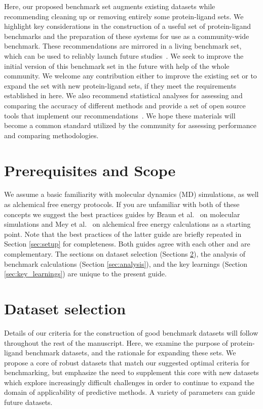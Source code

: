 \documentclass[9pt,bestpractices,pubversion]{livecoms}
\begin{document}
Here, our proposed benchmark set augments existing datasets while recommending cleaning up or removing entirely some protein-ligand sets. We highlight key considerations in the construction of a useful set of protein-ligand benchmarks and the preparation of these systems for use as a community-wide benchmark. These recommendations are mirrored in a living benchmark set, which can be used to reliably launch future studies~\cite{dfhahn_openforcefield_2021}. We seek to improve the initial version of this benchmark set in the future with help of the whole community. We welcome any contribution either to improve the existing set or to expand the set with new protein-ligand sets, if they meet the requirements established in here. 
%
We also recommend statistical analyses for assessing and comparing the accuracy of different methods and provide a set of open source tools that implement our recommendations~\cite{github_openforcefield_arsenic_2020}. 
%
We hope these materials will become a common standard utilized by the community for assessing performance and comparing methodologies.  


\section{Prerequisites and Scope}
We assume a basic familiarity with molecular dynamics (MD) simulations, as well as alchemical free energy protocols. 
If you are unfamiliar with both of these concepts we suggest the best practices guides by Braun et al.~\cite{braunBestPracticesFoundations2019} on molecular simulations and Mey et al.~\cite{meyBestPracticesAlchemical2020} on alchemical free energy calculations as a starting point. Note that the best practices of the latter guide are briefly repeated in Section \ref{sec:setup} for completeness. Both guides agree with each other and are complementary. The sections on dataset selection (Sections \ref{sec:dataset}), the analysis of benchmark calculations (Section \ref{sec:analysis}), and the key learnings (Section \ref{sec:key_learnings}) are unique to the present guide. 


\section{Dataset selection}
\label{sec:dataset}

Details of our criteria for the construction of good benchmark datasets will follow throughout the rest of the manuscript. 
Here, we examine the purpose of protein-ligand benchmark datasets, and the rationale for expanding these sets.
We propose a core of robust datasets that match our suggested optimal criteria for benchmarking, but emphasize the need to supplement this core with new datasets which explore increasingly difficult challenges in order to continue to expand the domain of applicability of predictive methods. 
A variety of parameters can guide future datasets.
\end{document}
